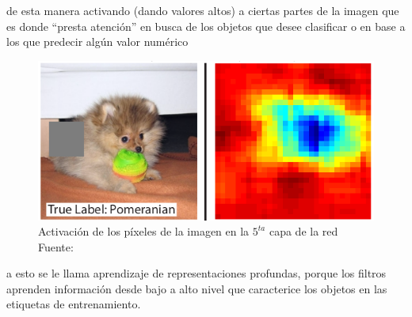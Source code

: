    \noindent de esta manera activando (dando valores altos) a ciertas partes de la imagen que es donde ``presta atención'' en busca de los objetos que desee clasificar o en base a los que predecir algún valor numérico

    \begin{figure}[H]
            \centering
            \includegraphics[scale=0.5]{imagenes/activation_cnn}
            \caption{Activación de los píxeles de la imagen en la $5^{ta}$ capa de la red\\ Fuente: \citep{10.1007/978-3-319-10590-1_53}}
        \end{figure}
    \noindent a esto se le llama aprendizaje de representaciones profundas, porque los filtros aprenden información desde bajo a alto nivel que caracterice los objetos en las etiquetas de entrenamiento. 